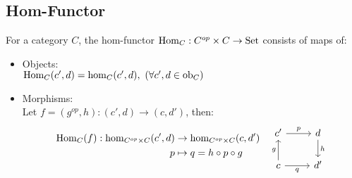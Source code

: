 \subsection*{Hom-Functor}
\begin{definition}
  For a category $C$, the hom-functor $\mathrm{Hom}_C : C^{op}\times C \to
  \mathrm{Set}$ consists of maps of: \parencite{lane:working_mathematician}
  \begin{itemize}
    \item Objects:\\
      $\mathrm{Hom}_C (c', d) = \hom_C (c', d),
        \ (\forall c', d\in \mathrm{ob}_C)$
    \item Morphisms:\\
      Let $f=(g^{op}, h): (c', d)\to (c, d')$, then:
      \[
        \begin{aligned}
          \Hom_C (f) : \hom_{C^{op}\times C}(c', d) &\to
            \hom_{C^{op}\times C}(c, d')\\
          p &\mapsto q = h\circ p\circ g
        \end{aligned}\quad
        \begin{tikzcd}
        {c'} & d \\
        c & {d'}
        \arrow["g", from=2-1, to=1-1]
        \arrow["h", from=1-2, to=2-2]
        \arrow["p", from=1-1, to=1-2]
        \arrow["q"', from=2-1, to=2-2]
        \end{tikzcd}
      \]
  \end{itemize}
\end{definition}
